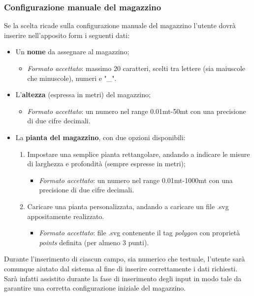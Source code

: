         \subsubsection{Configurazione manuale del magazzino}\label{sec:creazione:configurazione}
            Se la scelta ricade sulla configurazione manuale del magazzino l'utente dovrà inserire nell'apposito form i seguenti dati: 
            \begin{itemize}
                \item Un \textbf{nome} da assegnare al magazzino;
                    \begin{itemize}
                        \item \textit{Formato accettato}: massimo 20 caratteri, scelti tra lettere (sia maiuscole che minuscole), numeri e "\_".
                    \end{itemize}
                \item L'\textbf{altezza} (espressa in metri) del magazzino;
                     \begin{itemize}
                        \item \textit{Formato accettato}: un numero nel range 0.01mt-50mt con una precisione di due cifre decimali.
                    \end{itemize}
                \item La \textbf{pianta del magazzino}, con due opzioni disponibili:
                \begin{enumerate}
                    \item Impostare una semplice pianta rettangolare, andando a indicare le misure di larghezza e profondità (sempre espresse in metri);
                         \begin{itemize}
                            \item \textit{Formato accettato}: un numero nel range 0.01mt-1000mt con una precisione di due cifre decimali.
                        \end{itemize}
                    \item Caricare una pianta personalizzata, andando a caricare un file .svg appositamente realizzato.
                        \begin{itemize}
                            \item \textit{Formato accettato}: file .svg contenente il tag \textit{polygon} con proprietà \textit{points} definita (per almeno 3 punti).
                        \end{itemize}
                \end{enumerate}
            \end{itemize}
            Durante l'inserimento di ciascun campo, sia numerico che testuale, l'utente sarà comunque aiutato dal sistema al fine di inserire correttamente i dati richiesti.\\
            Sarà infatti assistito durante la fase di inserimento degli input in modo tale da garantire una corretta configurazione iniziale del magazzino.

